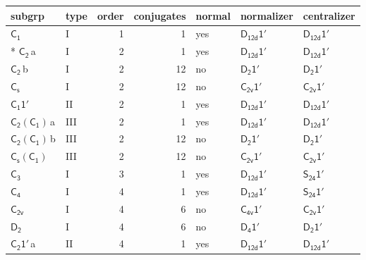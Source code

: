 \documentclass[10pt,a4paper]{article}
\numberwithin{equation}{section}
\newcommand{\grp}[1]{\mathsf{#1}}
\newcommand{\clsletter}[1]{\,{\scriptsize\color{black!55}#1}}
\begin{document}
{\small\begin{longtable}{@{}llrrlll@{}}\toprule
subgrp & type & order & conjugates & normal & normalizer & centralizer\\\midrule\endhead
\bottomrule\endfoot\endlastfoot
\href{../../../rotation/data/pdf/C1.pdf}{$\grp{C_{1}}$} & I & 1 & 1 & yes & \href{D12d-1p.pdf}{$\grp{D_{12d}1'}$} & \href{D12d-1p.pdf}{$\grp{D_{12d}1'}$}\\*
\href{../../../rotation/data/pdf/C2.pdf}{$\grp{C_{2}}$}\clsletter{a} & I & 2 & 1 & yes & \href{D12d-1p.pdf}{$\grp{D_{12d}1'}$} & \href{D12d-1p.pdf}{$\grp{D_{12d}1'}$}\\
\href{../../../rotation/data/pdf/C2.pdf}{$\grp{C_{2}}$}\clsletter{b} & I & 2 & 12 & no & \href{D2-1p.pdf}{$\grp{D_{2}1'}$} & \href{D2-1p.pdf}{$\grp{D_{2}1'}$}\\
\href{../../../rotation/data/pdf/C1v.pdf}{$\grp{C_{s}}$} & I & 2 & 12 & no & \href{C2v-1p.pdf}{$\grp{C_{2v}1'}$} & \href{C2v-1p.pdf}{$\grp{C_{2v}1'}$}\\
\href{C1-1p.pdf}{$\grp{C_{1}1'}$} & II & 2 & 1 & yes & \href{D12d-1p.pdf}{$\grp{D_{12d}1'}$} & \href{D12d-1p.pdf}{$\grp{D_{12d}1'}$}\\
\href{C2-C1.pdf}{$\grp{C_{2}}(\grp{C_{1}})$}\clsletter{a} & III & 2 & 1 & yes & \href{D12d-1p.pdf}{$\grp{D_{12d}1'}$} & \href{D12d-1p.pdf}{$\grp{D_{12d}1'}$}\\
\href{C2-C1.pdf}{$\grp{C_{2}}(\grp{C_{1}})$}\clsletter{b} & III & 2 & 12 & no & \href{D2-1p.pdf}{$\grp{D_{2}1'}$} & \href{D2-1p.pdf}{$\grp{D_{2}1'}$}\\
\href{C1v-C1.pdf}{$\grp{C_{s}}(\grp{C_{1}})$} & III & 2 & 12 & no & \href{C2v-1p.pdf}{$\grp{C_{2v}1'}$} & \href{C2v-1p.pdf}{$\grp{C_{2v}1'}$}\\
\href{../../../rotation/data/pdf/C3.pdf}{$\grp{C_{3}}$} & I & 3 & 1 & yes & \href{D12d-1p.pdf}{$\grp{D_{12d}1'}$} & \href{S24-1p.pdf}{$\grp{S_{24}1'}$}\\
\href{../../../rotation/data/pdf/C4.pdf}{$\grp{C_{4}}$} & I & 4 & 1 & yes & \href{D12d-1p.pdf}{$\grp{D_{12d}1'}$} & \href{S24-1p.pdf}{$\grp{S_{24}1'}$}\\
\href{../../../rotation/data/pdf/C2v.pdf}{$\grp{C_{2v}}$} & I & 4 & 6 & no & \href{C4v-1p.pdf}{$\grp{C_{4v}1'}$} & \href{C2v-1p.pdf}{$\grp{C_{2v}1'}$}\\
\href{../../../rotation/data/pdf/D2.pdf}{$\grp{D_{2}}$} & I & 4 & 6 & no & \href{D4-1p.pdf}{$\grp{D_{4}1'}$} & \href{D2-1p.pdf}{$\grp{D_{2}1'}$}\\
\href{C2-1p.pdf}{$\grp{C_{2}1'}$}\clsletter{a} & II & 4 & 1 & yes & \href{D12d-1p.pdf}{$\grp{D_{12d}1'}$} & \href{D12d-1p.pdf}{$\grp{D_{12d}1'}$}\\

\end{longtable}}
\end{document}
